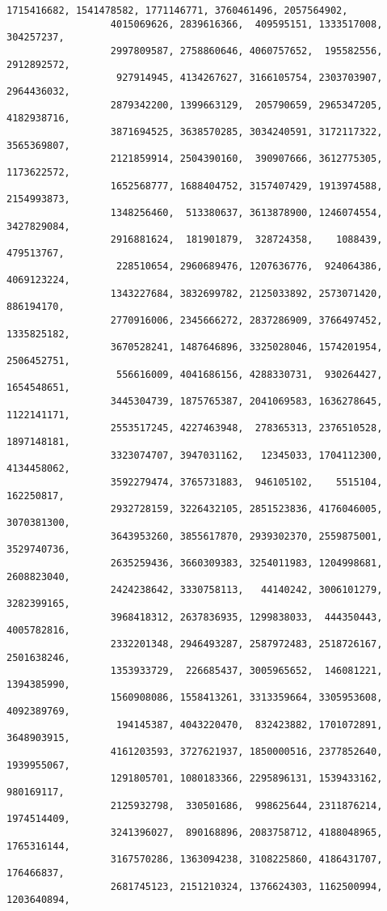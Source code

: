 \documentclass[11pt]{article}
\begin{document}
\begin{Verbatim}[commandchars=\\\{\}]
                  1715416682, 1541478582, 1771146771, 3760461496, 2057564902,
                  4015069626, 2839616366,  409595151, 1333517008,  304257237,
                  2997809587, 2758860646, 4060757652,  195582556, 2912892572,
                   927914945, 4134267627, 3166105754, 2303703907, 2964436032,
                  2879342200, 1399663129,  205790659, 2965347205, 4182938716,
                  3871694525, 3638570285, 3034240591, 3172117322, 3565369807,
                  2121859914, 2504390160,  390907666, 3612775305, 1173622572,
                  1652568777, 1688404752, 3157407429, 1913974588, 2154993873,
                  1348256460,  513380637, 3613878900, 1246074554, 3427829084,
                  2916881624,  181901879,  328724358,    1088439,  479513767,
                   228510654, 2960689476, 1207636776,  924064386, 4069123224,
                  1343227684, 3832699782, 2125033892, 2573071420,  886194170,
                  2770916006, 2345666272, 2837286909, 3766497452, 1335825182,
                  3670528241, 1487646896, 3325028046, 1574201954, 2506452751,
                   556616009, 4041686156, 4288330731,  930264427, 1654548651,
                  3445304739, 1875765387, 2041069583, 1636278645, 1122141171,
                  2553517245, 4227463948,  278365313, 2376510528, 1897148181,
                  3323074707, 3947031162,   12345033, 1704112300, 4134458062,
                  3592279474, 3765731883,  946105102,    5515104,  162250817,
                  2932728159, 3226432105, 2851523836, 4176046005, 3070381300,
                  3643953260, 3855617870, 2939302370, 2559875001, 3529740736,
                  2635259436, 3660309383, 3254011983, 1204998681, 2608823040,
                  2424238642, 3330758113,   44140242, 3006101279, 3282399165,
                  3968418312, 2637836935, 1299838033,  444350443, 4005782816,
                  2332201348, 2946493287, 2587972483, 2518726167, 2501638246,
                  1353933729,  226685437, 3005965652,  146081221, 1394385990,
                  1560908086, 1558413261, 3313359664, 3305953608, 4092389769,
                   194145387, 4043220470,  832423882, 1701072891, 3648903915,
                  4161203593, 3727621937, 1850000516, 2377852640, 1939955067,
                  1291805701, 1080183366, 2295896131, 1539433162,  980169117,
                  2125932798,  330501686,  998625644, 2311876214, 1974514409,
                  3241396027,  890168896, 2083758712, 4188048965, 1765316144,
                  3167570286, 1363094238, 3108225860, 4186431707,  176466837,
                  2681745123, 2151210324, 1376624303, 1162500994, 1203640894,

\end{Verbatim}
\end{document}
